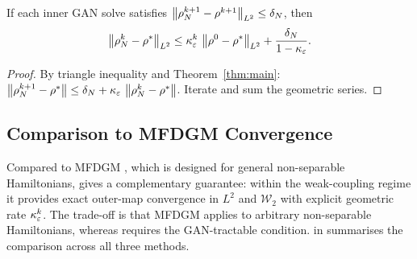 \begin{proposition}\label{prop:inexact}
If each inner GAN solve satisfies
$\left\lVert \rho^{k+1}_N - \rho^{k+1} \right\rVert_{L^2} \leq \delta_N$, then
\[
  \left\lVert \rho^k_N - \rho^* \right\rVert_{L^2}
  \leq \kappa_\varepsilon^k\,\left\lVert \rho^0 - \rho^* \right\rVert_{L^2}
  + \frac{\delta_N}{1-\kappa_\varepsilon}.
\]
\end{proposition}
\begin{proof}
By triangle inequality and Theorem~\ref{thm:main}:
$\left\lVert \rho^{k+1}_N - \rho^* \right\rVert \leq \delta_N + \kappa_\varepsilon\,\left\lVert \rho^k_N - \rho^* \right\rVert$.
Iterate and sum the geometric series.
\end{proof}

\subsection{Comparison to MFDGM Convergence}

Compared to MFDGM \citep{assouline2023deep}, which is designed for general
non-separable Hamiltonians,  gives a complementary guarantee:
within the weak-coupling regime it provides exact outer-map convergence in
$L^2$ and $\mathcal{W}_2$ with explicit geometric rate \(\kappa_\varepsilon^k\).
The trade-off is that MFDGM applies to arbitrary non-separable
Hamiltonians, whereas  requires the GAN-tractable
condition.
 in  summarises the comparison
across all three methods.
